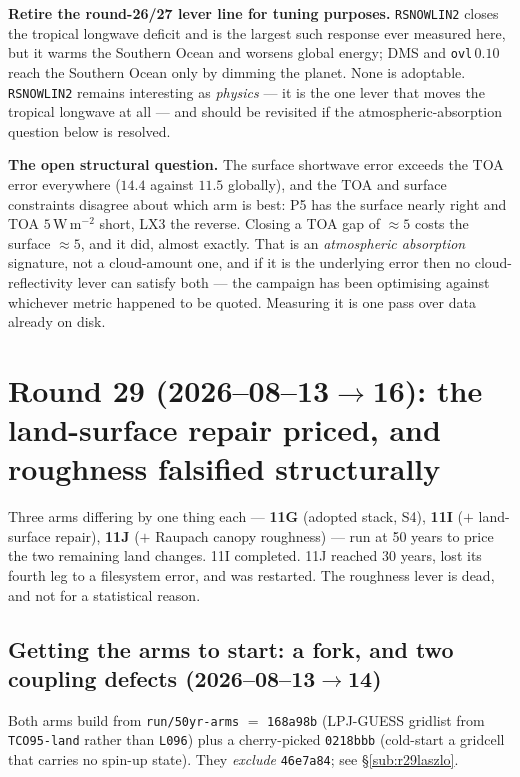 \documentclass[10pt]{article}
\begin{document}
\textbf{Retire the round-26/27 lever line for tuning purposes.} \texttt{RSNOWLIN2} closes
the tropical longwave deficit and is the largest such response ever measured here, but it
warms the Southern Ocean and worsens global energy; DMS and \texttt{ovl}$\,0.10$ reach the
Southern Ocean only by dimming the planet. None is adoptable. \texttt{RSNOWLIN2} remains
interesting as \emph{physics} --- it is the one lever that moves the tropical longwave at
all --- and should be revisited if the atmospheric-absorption question below is resolved.

\textbf{The open structural question.} The surface shortwave error exceeds the TOA error
everywhere ($14.4$ against $11.5$ globally), and the TOA and surface constraints disagree
about which arm is best: P5 has the surface nearly right and TOA $5$\,W\,m$^{-2}$ short,
LX3 the reverse. Closing a TOA gap of ${\approx}5$ costs the surface ${\approx}5$, and it
did, almost exactly. That is an \emph{atmospheric absorption} signature, not a cloud-amount
one, and if it is the underlying error then no cloud-reflectivity lever can satisfy both
--- the campaign has been optimising against whichever metric happened to be quoted.
Measuring it is one pass over data already on disk.

\section{Round 29 (2026--08--13$\to$16): the land-surface repair priced, and roughness
falsified structurally}\label{sec:r29}
Three arms differing by one thing each --- \textbf{11G} (adopted stack, S4), \textbf{11I}
(${+}$ land-surface repair), \textbf{11J} (${+}$ Raupach canopy roughness) --- run at 50
years to price the two remaining land changes. 11I completed. 11J reached 30 years, lost
its fourth leg to a filesystem error, and was restarted. The roughness lever is dead, and
not for a statistical reason.

\subsection{Getting the arms to start: a fork, and two coupling defects
(2026--08--13$\to$14)}\label{sub:r29start}
Both arms build from \texttt{run/50yr-arms} $=$ \texttt{168a98b} (LPJ-GUESS gridlist from
\texttt{TCO95-land} rather than \texttt{L096}) plus a cherry-picked \texttt{0218bbb}
(cold-start a gridcell that carries no spin-up state). They \emph{exclude}
\texttt{46e7a84}; see \S\ref{sub:r29laszlo}.
\end{document}
